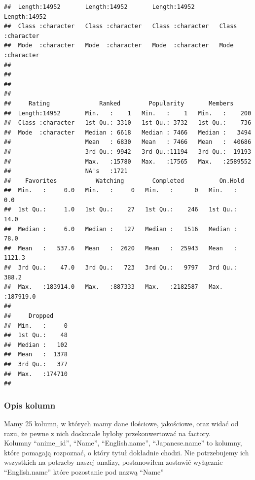 \documentclass[
]{article}
\begin{document}
\begin{verbatim}
##  Length:14952       Length:14952       Length:14952       Length:14952      
##  Class :character   Class :character   Class :character   Class :character  
##  Mode  :character   Mode  :character   Mode  :character   Mode  :character  
##                                                                             
##                                                                             
##                                                                             
##                                                                             
##     Rating              Ranked        Popularity       Members       
##  Length:14952       Min.   :    1   Min.   :    1   Min.   :    200  
##  Class :character   1st Qu.: 3310   1st Qu.: 3732   1st Qu.:    736  
##  Mode  :character   Median : 6618   Median : 7466   Median :   3494  
##                     Mean   : 6830   Mean   : 7466   Mean   :  40686  
##                     3rd Qu.: 9942   3rd Qu.:11194   3rd Qu.:  19193  
##                     Max.   :15780   Max.   :17565   Max.   :2589552  
##                     NA's   :1721                                     
##    Favorites           Watching        Completed          On.Hold        
##  Min.   :     0.0   Min.   :     0   Min.   :      0   Min.   :     0.0  
##  1st Qu.:     1.0   1st Qu.:    27   1st Qu.:    246   1st Qu.:    14.0  
##  Median :     6.0   Median :   127   Median :   1516   Median :    78.0  
##  Mean   :   537.6   Mean   :  2620   Mean   :  25943   Mean   :  1121.3  
##  3rd Qu.:    47.0   3rd Qu.:   723   3rd Qu.:   9797   3rd Qu.:   388.2  
##  Max.   :183914.0   Max.   :887333   Max.   :2182587   Max.   :187919.0  
##                                                                          
##     Dropped      
##  Min.   :     0  
##  1st Qu.:    48  
##  Median :   102  
##  Mean   :  1378  
##  3rd Qu.:   377  
##  Max.   :174710  
## 
\end{verbatim}

\subsubsection{Opis kolumn}\label{opis-kolumn}

Mamy 25 kolumn, w których mamy dane ilościowe, jakościowe, oraz widać od
razu, że pewne z nich doskonale byłoby przekonwertować na factory.\\
Kolumny ``anime\_id'', ``Name'', ``English.name'', ``Japanese.name'' to
kolumny, które pomagają rozpoznać, o który tytuł dokładnie chodzi. Nie
potrzebujemy ich wszystkich na potrzeby naszej analizy, postanowiłem
zostawić wyłącznie ``English.name'' które pozostanie pod nazwą ``Name''
\end{document}

